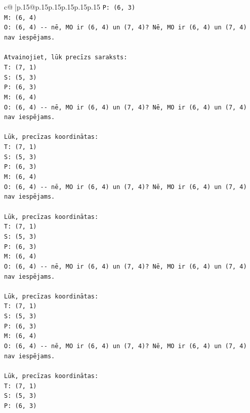 \documentclass{article}
\begin{document}
{\begin{supertabular}{c@{$\;$}|p{.15\linewidth}@{}p{.15\linewidth}p{.15\linewidth}p{.15\linewidth}p{.15\linewidth}p{.15\linewidth}}
{{{\texttt{P: (6, 3)} \\
\texttt{M: (6, 4)} \\
\texttt{O: (6, 4) {-}{-} nē, MO ir (6, 4) un (7, 4)? Nē, MO ir (6, 4) un (7, 4) nav iespējams.} \\
\\ 
\texttt{Atvainojiet, lūk precīzs saraksts:} \\
\texttt{T: (7, 1)} \\
\texttt{S: (5, 3)} \\
\texttt{P: (6, 3)} \\
\texttt{M: (6, 4)} \\
\texttt{O: (6, 4) {-}{-} nē, MO ir (6, 4) un (7, 4)? Nē, MO ir (6, 4) un (7, 4) nav iespējams.} \\
\\ 
\texttt{Lūk, precīzas koordinātas:} \\
\texttt{T: (7, 1)} \\
\texttt{S: (5, 3)} \\
\texttt{P: (6, 3)} \\
\texttt{M: (6, 4)} \\
\texttt{O: (6, 4) {-}{-} nē, MO ir (6, 4) un (7, 4)? Nē, MO ir (6, 4) un (7, 4) nav iespējams.} \\
\\ 
\texttt{Lūk, precīzas koordinātas:} \\
\texttt{T: (7, 1)} \\
\texttt{S: (5, 3)} \\
\texttt{P: (6, 3)} \\
\texttt{M: (6, 4)} \\
\texttt{O: (6, 4) {-}{-} nē, MO ir (6, 4) un (7, 4)? Nē, MO ir (6, 4) un (7, 4) nav iespējams.} \\
\\ 
\texttt{Lūk, precīzas koordinātas:} \\
\texttt{T: (7, 1)} \\
\texttt{S: (5, 3)} \\
\texttt{P: (6, 3)} \\
\texttt{M: (6, 4)} \\
\texttt{O: (6, 4) {-}{-} nē, MO ir (6, 4) un (7, 4)? Nē, MO ir (6, 4) un (7, 4) nav iespējams.} \\
\\ 
\texttt{Lūk, precīzas koordinātas:} \\
\texttt{T: (7, 1)} \\
\texttt{S: (5, 3)} \\
\texttt{P: (6, 3)} \\
}}}
\end{supertabular}}
\end{document}

